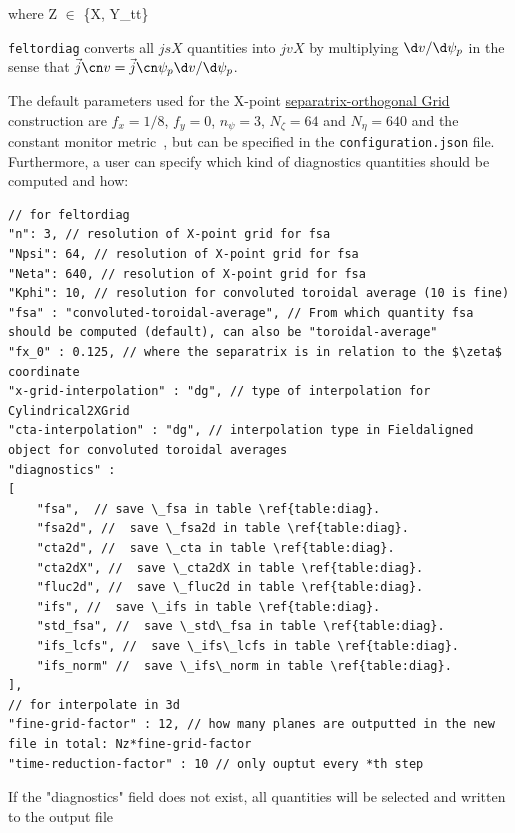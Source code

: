 where Z $\in$ \{X, Y\_tt\}
\begin{tcolorbox}[title=Note]
    \texttt{feltordiag} converts all $jsX$ quantities into $jvX$
by multiplying $\d v/\d \psi_p$
in the sense that $\vec j\cn v  = \vec j \cn \psi_p \d v/\d\psi_p$.
\end{tcolorbox}
The default parameters used for the X-point
\href{https://feltor-dev.github.io/doc/geometries/html/structdg_1_1geo_1_1_separatrix_orthogonal.html}{separatrix-orthogonal Grid}
construction are $f_x = 1/8$, $f_y = 0$, $n_\psi = 3$, $N_\zeta = 64$ and
$N_\eta = 640$ and the constant monitor metric~\cite{Wiesenberger2018}, but can be specified in the \texttt{configuration.json} file.
Furthermore, a user can specify which kind of diagnostics quantities should be computed and how:
\begin{verbatim}
// for feltordiag
"n": 3, // resolution of X-point grid for fsa
"Npsi": 64, // resolution of X-point grid for fsa
"Neta": 640, // resolution of X-point grid for fsa
"Kphi": 10, // resolution for convoluted toroidal average (10 is fine)
"fsa" : "convoluted-toroidal-average", // From which quantity fsa should be computed (default), can also be "toroidal-average"
"fx_0" : 0.125, // where the separatrix is in relation to the $\zeta$ coordinate
"x-grid-interpolation" : "dg", // type of interpolation for Cylindrical2XGrid
"cta-interpolation" : "dg", // interpolation type in Fieldaligned object for convoluted toroidal averages
"diagnostics" :
[
    "fsa",  // save \_fsa in table \ref{table:diag}.
    "fsa2d", //  save \_fsa2d in table \ref{table:diag}.
    "cta2d", //  save \_cta in table \ref{table:diag}.
    "cta2dX", //  save \_cta2dX in table \ref{table:diag}.
    "fluc2d", //  save \_fluc2d in table \ref{table:diag}.
    "ifs", //  save \_ifs in table \ref{table:diag}.
    "std_fsa", //  save \_std\_fsa in table \ref{table:diag}.
    "ifs_lcfs", //  save \_ifs\_lcfs in table \ref{table:diag}.
    "ifs_norm" //  save \_ifs\_norm in table \ref{table:diag}.
],
// for interpolate in 3d
"fine-grid-factor" : 12, // how many planes are outputted in the new file in total: Nz*fine-grid-factor
"time-reduction-factor" : 10 // only ouptut every *th step
\end{verbatim}
\begin{tcolorbox}[title=Note]
    If the "diagnostics" field does not exist, all quantities will be selected and written to the output file
\end{tcolorbox}


